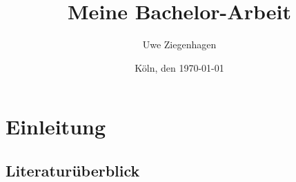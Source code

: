 \documentclass[12pt,ngerman,parskip=half]{scrbook}
\author{Uwe Ziegenhagen}
\title{Meine Bachelor-Arbeit}
\date{Köln, den \today}
\begin{document}
\maketitle

\tableofcontents

\listoffigures

\listoftables

\chapter{Einleitung}

\section{Literaturüberblick}

\blindtext[5]

\blindtext[5]

\blindtext[5]

\blindtext[5]

\blindtext[5]
\end{document}
